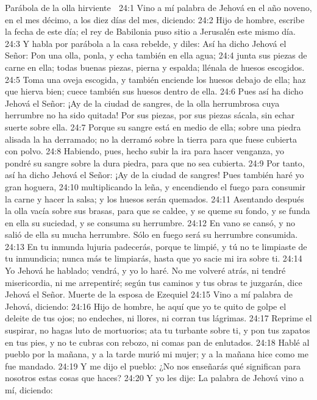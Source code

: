 Parábola de la olla hirviente  

24:1 Vino a mí palabra de Jehová en el año noveno, en el mes décimo, a los diez días del mes, diciendo:  
24:2 Hijo de hombre, escribe la fecha de este día; el rey de Babilonia puso sitio a Jerusalén este mismo día.  
24:3 Y habla por parábola a la casa rebelde, y diles: Así ha dicho Jehová el Señor: Pon una olla, ponla, y echa también en ella agua;  
24:4 junta sus piezas de carne en ella; todas buenas piezas, pierna y espalda; llénala de huesos escogidos.  
24:5 Toma una oveja escogida, y también enciende los huesos debajo de ella; haz que hierva bien; cuece también sus huesos dentro de ella.  
24:6 Pues así ha dicho Jehová el Señor: ¡Ay de la ciudad de sangres, de la olla herrumbrosa cuya herrumbre no ha sido quitada! Por sus piezas, por sus piezas sácala, sin echar suerte sobre ella.  
24:7 Porque su sangre está en medio de ella; sobre una piedra alisada la ha derramado; no la derramó sobre la tierra para que fuese cubierta con polvo.  
24:8 Habiendo, pues, hecho subir la ira para hacer venganza, yo pondré su sangre sobre la dura piedra, para que no sea cubierta.  
24:9 Por tanto, así ha dicho Jehová el Señor: ¡Ay de la ciudad de sangres! Pues también haré yo gran hoguera,  
24:10 multiplicando la leña, y encendiendo el fuego para consumir la carne y hacer la salsa; y los huesos serán quemados.  
24:11 Asentando después la olla vacía sobre sus brasas, para que se caldee, y se queme su fondo, y se funda en ella su suciedad, y se consuma su herrumbre.  
24:12 En vano se cansó, y no salió de ella su mucha herrumbre. Sólo en fuego será su herrumbre consumida.  
24:13 En tu inmunda lujuria padecerás, porque te limpié, y tú no te limpiaste de tu inmundicia; nunca más te limpiarás, hasta que yo sacie mi ira sobre ti.  
24:14 Yo Jehová he hablado; vendrá, y yo lo haré. No me volveré atrás, ni tendré misericordia, ni me arrepentiré; según tus caminos y tus obras te juzgarán, dice Jehová el Señor.  
Muerte de la esposa de Ezequiel  
24:15 Vino a mí palabra de Jehová, diciendo:  
24:16 Hijo de hombre, he aquí que yo te quito de golpe el deleite de tus ojos; no endeches, ni llores, ni corran tus lágrimas.  
24:17 Reprime el suspirar, no hagas luto de mortuorios; ata tu turbante sobre ti, y pon tus zapatos en tus pies, y no te cubras con rebozo, ni comas pan de enlutados.  
24:18 Hablé al pueblo por la mañana, y a la tarde murió mi mujer; y a la mañana hice como me fue mandado.  
24:19 Y me dijo el pueblo: ¿No nos enseñarás qué significan para nosotros estas cosas que haces?  
24:20 Y yo les dije: La palabra de Jehová vino a mí, diciendo:  
